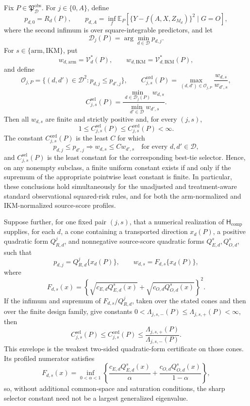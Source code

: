 Fix \(P\in\mathfrak P_{\mathcal D}^{\mathrm{obs}}\).  For \(j\in\{0,A\}\), define
\[
 p_{d,0}=R_d(P),
 \qquad
 p_{d,A}=\inf_f\mathbb E_P\!\left[
 \{Y-f(A,X,Z_{M_d})\}^2\mid G=O\right],
\]
where the second infimum is over square-integrable predictors, and let
\[
 \mathcal D_j(P)=\arg\min_{d\in\mathcal D}p_{d,j}.
\]
For \(s\in\{\mathrm{arm},\mathrm{IKM}\}\), put
\[
 w_{d,\mathrm{arm}}=\mathcal V_d^*(P),
 \qquad
 w_{d,\mathrm{IKM}}=\mathcal V_{d,\mathrm{IKM}}^*(P),
\]
and define
\[
 \mathcal O_{j,P}=\{(d,d')\in\mathcal D^2:p_{d,j}\le p_{d',j}\},
 \qquad
 C_{j,s}^{\mathrm{ord}}(P)
 =\max_{(d,d')\in\mathcal O_{j,P}}
 \frac{w_{d,s}}{w_{d',s}},
\]
\[
 C_{j,s}^{\mathrm{sel}}(P)
 =\frac{\min_{d\in\mathcal D_j(P)}w_{d,s}}
 {\min_{d'\in\mathcal D}w_{d',s}}.
\]
Then all \(w_{d,s}\) are finite and strictly positive and, for every \((j,s)\),
\[
 1\le C_{j,s}^{\mathrm{sel}}(P)
 \le C_{j,s}^{\mathrm{ord}}(P)<\infty.
\]
The constant \(C_{j,s}^{\mathrm{ord}}(P)\) is the least \(C\) for which
\[
 p_{d,j}\le p_{d',j}\Longrightarrow w_{d,s}\le Cw_{d',s}
 \quad\text{for every }d,d'\in\mathcal D,
\]
and \(C_{j,s}^{\mathrm{sel}}(P)\) is the least constant for the corresponding best-tie selector.  Hence, on any nonempty subclass, a finite uniform constant exists if and only if the supremum of the appropriate pointwise least constant is finite.  In particular, these conclusions hold simultaneously for the unadjusted and treatment-aware standard observational squared-risk rules, and for both the arm-normalized and IKM-normalized source-score profiles.

Suppose further, for one fixed pair \((j,s)\), that a numerical realization of \(\mathsf H_{\mathrm{comp}}\) supplies, for each \(d\), a cone containing a transported direction \(x_d(P)\), a positive quadratic form \(Q_{R,d}^{j}\), and nonnegative source-score quadratic forms \(Q_{E,d}^{s},Q_{O,d}^{s}\), such that
\[
 p_{d,j}=Q_{R,d}^{j}\{x_d(P)\},
 \qquad
 w_{d,s}=F_{d,s}\{x_d(P)\},
\]
where
\[
 F_{d,s}(x)=
 \left\{\sqrt{c_{E,d}Q_{E,d}^{s}(x)}
 +\sqrt{c_{O,d}Q_{O,d}^{s}(x)}\right\}^{2}.
\]
If the infimum and supremum of \(F_{d,s}/Q_{R,d}^{j}\), taken over the stated cones and then over the finite design family, give constants \(0<\Lambda_{j,s,-}(P)\le\Lambda_{j,s,+}(P)<\infty\), then
\[
 C_{j,s}^{\mathrm{sel}}(P)
 \le C_{j,s}^{\mathrm{ord}}(P)
 \le\frac{\Lambda_{j,s,+}(P)}{\Lambda_{j,s,-}(P)}.
\]
This envelope is the weakest two-sided quadratic-form certificate on those cones.  Its profiled numerator satisfies
\[
 F_{d,s}(x)=\inf_{0<\alpha<1}
 \left\{
 \frac{c_{E,d}Q_{E,d}^{s}(x)}{\alpha}
 +\frac{c_{O,d}Q_{O,d}^{s}(x)}{1-\alpha}
 \right\},
\]
so, without additional common-space and saturation conditions, the sharp selector constant need not be a largest generalized eigenvalue.
